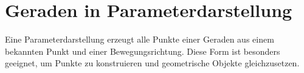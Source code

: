 \section{Geraden in Parameterdarstellung}
\label{sec:analytic_geometry_lines}

Eine Parameterdarstellung erzeugt alle Punkte einer Geraden aus einem
bekannten Punkt und einer Bewegungsrichtung. Diese Form ist besonders
geeignet, um Punkte zu konstruieren und geometrische Objekte gleichzusetzen.



